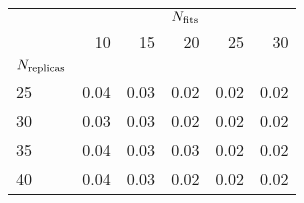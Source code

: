 \begin{center}
    \begin{tabular}{lrrrrr}
        \toprule
        {} & \multicolumn{5}{c}{$N_{\rm fits}$} \\
        {} &   10 &   15 &   20 &   25 &   30 \\
        $N_{\rm replicas}$ &      &      &      &      &      \\
        \midrule
        25            & 0.04 & 0.03 & 0.02 & 0.02 & 0.02 \\
        30            & 0.03 & 0.03 & 0.02 & 0.02 & 0.02 \\
        35            & 0.04 & 0.03 & 0.03 & 0.02 & 0.02 \\
        40            & 0.04 & 0.03 & 0.02 & 0.02 & 0.02 \\
        \bottomrule
        \end{tabular}
\end{center}